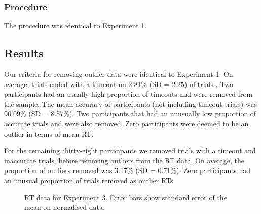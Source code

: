\documentclass[
  man,
  floatsintext,
  longtable,
  nolmodern,
  notxfonts,
  notimes,
  colorlinks=true,linkcolor=blue,citecolor=blue,urlcolor=blue]{apa7}
\begin{document}
\subsubsection{Procedure}\label{procedure-2}

The procedure was identical to Experiment 1.

\subsection{Results}\label{results-2}

Our criteria for removing outlier data were identical to Experiment 1.
On average, trials ended with a timeout on 2.81\% (SD = 2.25) of trials
. Two participants had an usually high proportion of timeouts and were
removed from the sample. The mean accuracy of participants (not
including timeout trials) was 96.09\% (SD = 8.57\%). Two participants
that had an unusually low proportion of accurate trials and were also
removed. Zero participants were deemed to be an outlier in terms of mean
RT.

For the remaining thirty-eight participants we removed trials with a
timeout and inaccurate trials, before removing outliers from the RT
data. On average, the proportion of outliers removed was 3.17\% (SD =
0.71\%). Zero participants had an unusual proportion of trials removed
as outlier RTs.

\begin{figure}[H]

\caption{\label{fig-RT-exp3}RT data for Experiment 3. Error bars show
standard error of the mean on normalised data.}


\end{figure}%
\end{document}
